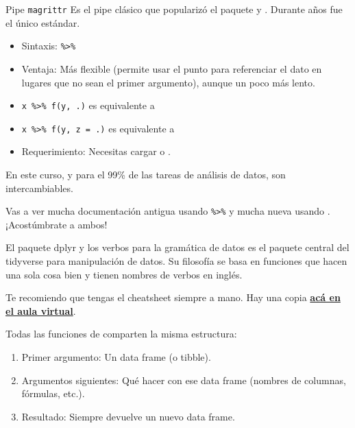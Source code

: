 \documentclass[8pt]{beamer}
\begin{document}
\begin{frame}[fragile]{Pipe \texttt{magrittr}}
	Es el pipe clásico que popularizó el paquete  y . Durante años fue el único estándar.

	
	\begin{itemize}
		\item Sintaxis: \lstinline[style=RScript, basicstyle = \normalfont\ttfamily]`%>%`
		\item Ventaja: Más flexible (permite usar el punto  para referenciar el dato en lugares que no sean el primer argumento), aunque un poco más lento.
		\item \lstinline[style=RScript, basicstyle = \normalfont\ttfamily]`x %>% f(y, .)` es equivalente a 
		\item \lstinline[style=RScript, basicstyle = \normalfont\ttfamily]`x %>% f(y, z = .)` es equivalente a 
		\item Requerimiento: Necesitas cargar  o .
	\end{itemize}
	
	En este curso, y para el 99\% de las tareas de análisis de datos, son intercambiables. 
	
	Vas a ver mucha documentación antigua usando \lstinline[style=RScript, basicstyle = \normalfont]`%>%` y mucha nueva usando \rscript{|>}. ¡Acostúmbrate a ambos!
\end{frame}







\begin{frame}[fragile]{El paquete dplyr y los verbos para la gramática de datos}
	 es el paquete central del tidyverse para manipulación de datos. Su filosofía se basa en funciones que hacen una sola cosa bien y tienen nombres de verbos en inglés.
	
	Te recomiendo que tengas el cheatsheet siempre a mano. Hay una copia \href{https://servicios.unl.edu.ar/aulavirtual/fce/mod/resource/view.php?id=67152&redirect=1}{\textbf{ac\'a en el aula virtual}}.
	
	Todas las funciones de  comparten la misma estructura:
	\begin{enumerate}
		\item Primer argumento: Un data frame (o tibble).
		\item Argumentos siguientes: Qué hacer con ese data frame (nombres de columnas, fórmulas, etc.).
		\item Resultado: Siempre devuelve un nuevo data frame.
	\end{enumerate}
\end{frame}
\end{document}
